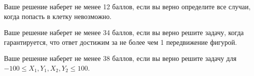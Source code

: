 Ваше решение наберет не менее 12 баллов, если вы верно определите все случаи, когда попасть в клетку невозможно.

Ваше решение наберет не менее 34 баллов, если вы верно решите задачу, когда гарантируется, что ответ достижим за не более чем 1 передвижение фигурой.

Ваше решение наберет не менее 38 баллов, если вы верно решите задачу для $-100 \leq X_1, Y_1, X_2, Y_2 \leq 100$.